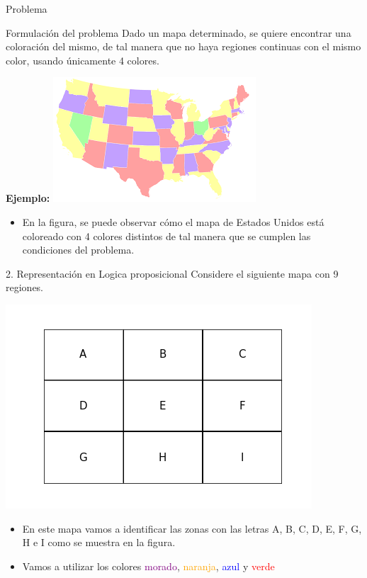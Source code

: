 \documentclass[10pt]{beamer}
\begin{document}
\begin{frame}{Problema}
\begin{block}{Formulación del problema}
\justify Dado un mapa determinado, se quiere encontrar una coloración del mismo, de tal manera que no haya regiones continuas con el mismo color, usando únicamente 4 colores. 
\end{block}
\begin{multicols}{2}
\textbf{Ejemplo:}
\includegraphics[scale=0.53]{Images/Mapa2.png}
\begin{itemize}
\item  \justify En la figura, se puede observar cómo el mapa de Estados Unidos está coloreado con 4 colores distintos de tal manera que se cumplen las condiciones del problema.
\end{itemize}
\end{multicols}
\end{frame}

\begin{frame}{2. Representación en Logica proposicional}
Considere el siguiente mapa con 9 regiones. 
\begin{multicols}{2}
\includegraphics[scale=0.35]{Images/Mapa3.png}
\begin{itemize}
\item \justify En este mapa vamos a identificar las zonas con las letras A, B, C, D, E, F, G, H e I como se muestra en la figura.
\item  \justify Vamos a utilizar los colores \textcolor{purple}{morado}, \textcolor{orange}{naranja}, \textcolor{blue}{azul} y \textcolor{red}{verde}
\end{itemize}
\end{multicols}
\end{frame}
\end{document}
